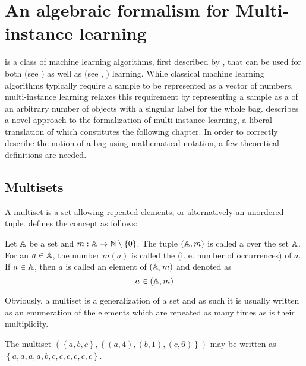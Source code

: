 \chapter{An algebraic formalism for Multi-instance learning}

 is a class of machine learning algorithms, first described by \cite{dietterich_solving_1997}, that can be used for both  (see \cite{amores_multiple_2013}) as well as  (see \cite{zhang_multi-instance_2009}, \cite{chen_contextual_2012}) learning. While classical machine learning algorithms typically require a sample to be represented as a vector of numbers, multi-instance learning relaxes this requirement by representing a sample as a  of an arbitrary number of objects with a singular label for the whole bag. \cite{dedic_hierarchicke_2017} describes a novel approach to the formalization of multi-instance learning, a liberal translation of which constitutes the following chapter.
In order to correctly describe the notion of a bag using mathematical notation, a few theoretical definitions are needed.

\section{Multisets}

A multiset is a set allowing repeated elements, or alternatively an unordered tuple. \cite{knuth_art_1968} defines the concept as follows:

\begin{define}
	Let \( \mathbb{A} \) be a set and \( m : \mathbb{A} \to \mathbb{N} \setminus \left\{ 0 \right\} \). The tuple \( \left( \mathbb{A}, m \right) \) is called a  over the set \( \mathbb{A} \). For an \( a \in \mathbb{A} \), the number \( m \left( a \right) \) is called the  (i. e. number of occurrences) of \( a \). If \( a \in \mathbb{A} \), then \( a \) is called an element of \( \left( \mathbb{A}, m \right) \) and denoted as
	\[ a \in \left( \mathbb{A}, m \right) \]
\end{define}

Obviously, a multiset is a generalization of a set and as such it is usually written as an enumeration of the elements which are repeated as many times as is their multiplicity.

\begin{example}
	The multiset \( \left( \left\{ a, b, c \right\}, \left\{ \left( a, 4 \right), \left( b, 1 \right), \left( c, 6 \right) \right\} \right) \) may be written as \( \left\{ a, a, a, a, b, c, c, c, c, c, c \right\} \).
\end{example}

